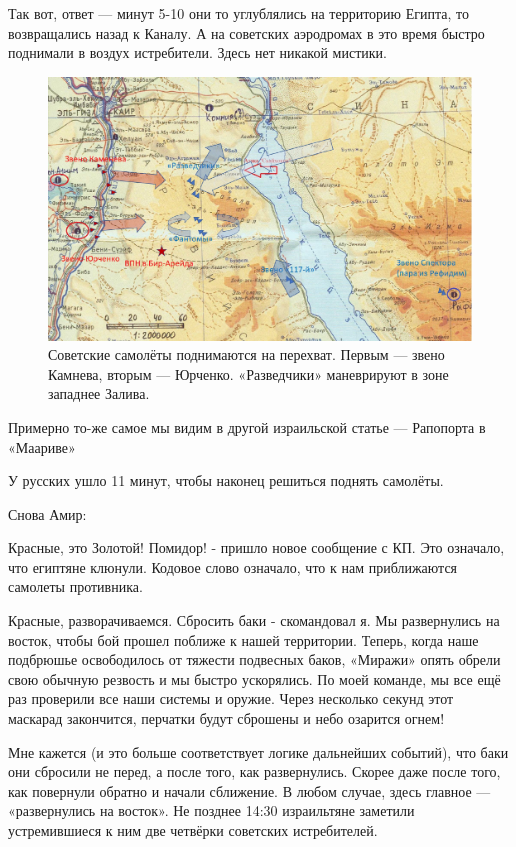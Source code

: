 Так вот, ответ — минут 5-10 они то углублялись на территорию Египта, то возвращались назад к Каналу. А на советских аэродромах в это время быстро поднимали в воздух истребители. Здесь нет никакой мистики. 

\begin{figure}[h!tb] 
	\centering\includegraphics[scale=0.25]{Dolina_5/ozXWHNIA4io.jpg}
	\caption{Советские самолёты поднимаются на перехват. Первым — звено Камнева, вторым — Юрченко. «Разведчики» маневрируют в зоне западнее Залива. }%
\end{figure}

Примерно то-же самое мы видим в другой израильской статье — Рапопорта в «Маариве» 

\begin{textcitation}
	У русских ушло 11 минут, чтобы наконец решиться поднять самолёты.
\end{textcitation}

Снова Амир:

\begin{textcitation}
	Красные, это Золотой! Помидор! - пришло новое сообщение с КП. Это означало, что египтяне клюнули. Кодовое слово означало, что к нам приближаются самолеты противника.
	
	Красные, разворачиваемся. Сбросить баки - скомандовал я. Мы развернулись на восток, чтобы бой прошел поближе к нашей территории. Теперь, когда наше подбрюшье освободилось от тяжести подвесных баков, «Миражи» опять обрели свою обычную резвость и мы быстро ускорялись. По моей команде, мы все ещё раз проверили все наши системы и оружие. Через несколько секунд этот маскарад закончится, перчатки будут сброшены и небо озарится огнем!
\end{textcitation}
Мне кажется (и это больше соответствует логике дальнейших событий), что баки они сбросили не перед, а после того, как развернулись. Скорее даже после того, как повернули обратно и начали сближение. В любом случае, здесь главное — «развернулись на восток». Не позднее 14:30 израильтяне заметили устремившиеся к ним две четвёрки советских истребителей.

